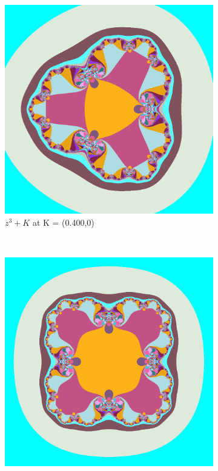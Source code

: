 \documentclass[a4paper]{article}
\begin{document}
\begin{figure}[!ht]
    \centering
    \begin{subfigure}[h]{0.28\textwidth}
        \includegraphics[width=\textwidth]{JuliaCubed}
        \caption{$z^3 + K$ at K = (0.400,0)}
        \label{fig:gull}
    \end{subfigure}%
    ~ %
    \begin{subfigure}[h]{0.28\textwidth}
        \includegraphics[width=\textwidth]{juliaZFour}

\end{subfigure}
\end{figure}
\end{document}
